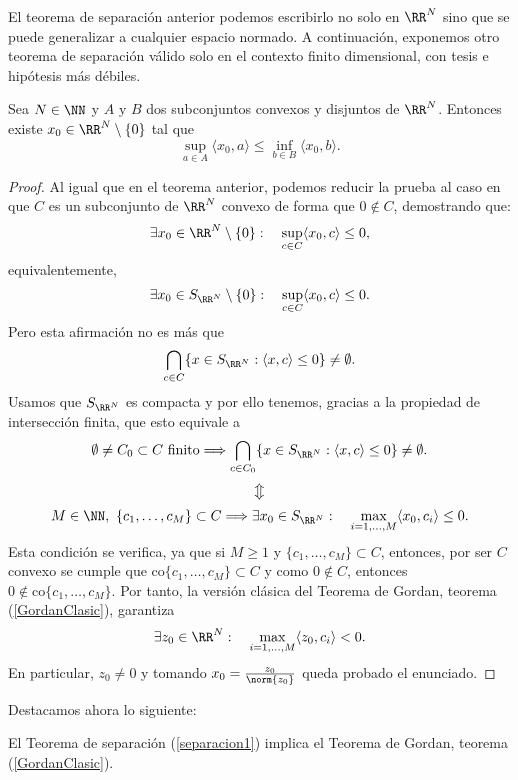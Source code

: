 El teorema de separación anterior podemos escribirlo no solo en $ \RR^N $ sino que se puede generalizar a cualquier espacio normado. A continuación, exponemos otro teorema de separación válido solo en el contexto finito dimensional, con tesis e hipótesis más débiles.

\begin{teoremaBox}
Sea $ N \in \NN $ y $ A \text{ y } B$ dos subconjuntos convexos y disjuntos de $ \RR^N $. Entonces existe $ x_0 \in \RR^N \setminus \{0\} $ tal que
\[
\sup_{a \in A} \langle x_0,a\rangle \leq \inf_{b\in B} \langle x_0,b\rangle.
\]
\end{teoremaBox}
\begin{proof}
Al igual que en el teorema anterior, podemos reducir la prueba al caso en que $ C $ es un subconjunto de $ \RR^N $ convexo de forma que $ 0 \notin C $, demostrando que:
\[
\exists x_0 \in \RR^N \setminus \{0\}: \quad \sup_{c \in C} \langle x_0, c \rangle \leq 0,
\]
equivalentemente, 
\[
\exists x_0 \in S_{\RR^N} \setminus \{0\}: \quad \sup_{c \in C} \langle x_0, c \rangle \leq 0.
\]
Pero esta afirmación no es más que
\[
\bigcap_{c \in C} \{x \in S_{\RR^N}: \langle x, c \rangle \leq 0 \} \neq \emptyset.
\]
Usamos que $ S_{\RR^N} $ es compacta y por ello tenemos, gracias a la propiedad de intersección finita, que esto equivale a
\[
\emptyset \neq C_0 \subset C \text{ finito} \Longrightarrow \bigcap_{c \in C_0} \{x \in S_{\RR^N}: \langle x, c \rangle \leq 0 \} \neq \emptyset.
\]
\[
\big\Updownarrow
\]
\[
M \in \NN, \text{ } \{c_1,\dots, c_M\} \subset C\Longrightarrow \exists x_0 \in S_{\RR^N}: \quad \max_{i=1,\dots,M} \langle x_0, c_i \rangle \leq 0.
\]
Esta condición se verifica, ya que si $ M \geq 1 $ y $ \{c_1,\dots, c_M\} \subset C $, entonces, por ser $ C $ convexo se cumple que $ \mathrm{co}\{c_1,\dots, c_M \} \subset C $ y como $ 0 \notin C $, entonces $  0 \notin \mathrm{co}\{c_1,\dots, c_M \} $. Por tanto, la versión clásica del Teorema de Gordan, teorema (\ref{GordanClasic}), garantiza
\[
\exists z_0 \in \RR^N: \quad \max_{i=1,\dots,M} \langle z_0, c_i \rangle < 0.
\]
En particular, $ z_0 \neq 0 $ y tomando $ x_0 = \frac{z_0}{\norm{z_0}} $ queda probado el enunciado.
\end{proof}

Destacamos ahora lo siguiente:
\begin{observacion}
El Teorema de separación (\ref{separacion1}) implica el Teorema de Gordan, teorema (\ref{GordanClasic}).
\end{observacion}

